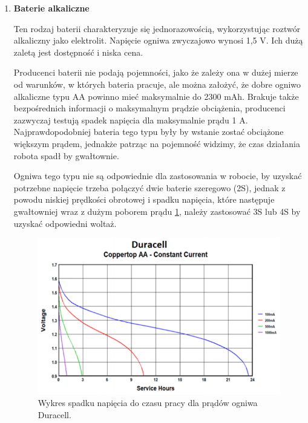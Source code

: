 \documentclass{report}
\begin{document}
\begin{enumerate}[label=(\Alph*)]
    \item \textbf{Baterie alkaliczne}

    Ten rodzaj baterii charakteryzuje się jednorazowością, wykorzystując roztwór alkaliczny jako elektrolit. Napięcie ogniwa zwyczajowo wynosi 1,5 V. Ich dużą zaletą jest dostępność i niska cena.
    
    Producenci baterii nie podają pojemności, jako że zależy ona w dużej mierze od warunków, w których bateria pracuje, ale można założyć, że dobre ogniwo alkaliczne typu AA powinno mieć maksymalnie do 2300 mAh. Brakuje także bezpośrednich informacji o maksymalnym prądzie obciążenia, producenci zazwyczaj testują spadek napięcia dla maksymalnie prądu 1 A. Najprawdopodobniej bateria tego typu były by wstanie zostać obciążone większym prądem, jednakże patrząc na pojemność widzimy, że czas działania robota spadł by gwałtownie.
    
    Ogniwa tego typu nie są odpowiednie dla zastosowania w robocie, by uzyskać potrzebne napięcie trzeba połączyć dwie baterie szeregowo (2S), jednak z powodu niskiej prędkości obrotowej i spadku napięcia, które następuje gwałtowniej wraz z dużym poborem prądu \ref{fig:duracell}, należy zastosować 3S lub 4S by uzyskać odpowiedni woltaż.
    
    \begin{figure}[H]
        \centering
        \includegraphics{src/cells_charts/Duracell discharge.png}
        \caption{Wykres spadku napięcia do czasu pracy dla prądów ogniwa Duracell.}
        \label{fig:duracell}
    \end{figure}


\end{enumerate}
\end{document}
